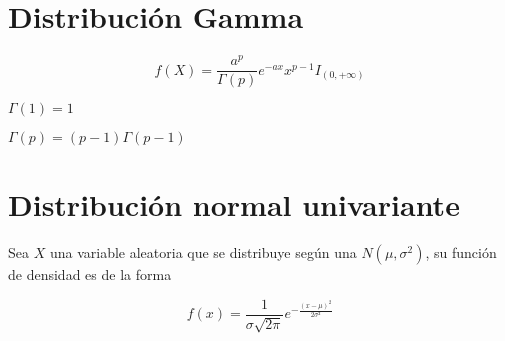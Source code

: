 \section{Distribución Gamma}
$$f(X)=\frac{a^p}{\Gamma (p)}e^{-ax}x^{p-1}I_{(0,+\infty)}$$

\begin{itemize*}
  \item $\Gamma (1) = 1$
  \item $\Gamma (p) = (p-1)\Gamma(p-1)$ 
\end{itemize*}

\section{Distribución normal univariante}

Sea $X$ una variable aleatoria que se distribuye según una
$N(\mu,\sigma^2)$, su función de densidad es de la forma

$$f(x)=\frac{1}{\sigma\sqrt{2\pi}}e^{-\frac{(x-\mu)^2}{2\sigma²}}$$